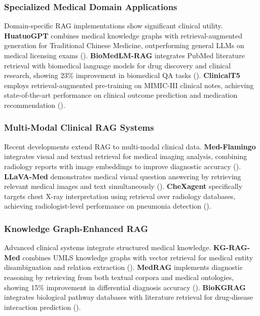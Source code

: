 \subsubsection{Specialized Medical Domain Applications}
Domain-specific RAG implementations show significant clinical utility. \textbf{HuatuoGPT} combines medical knowledge graphs with retrieval-augmented generation for Traditional Chinese Medicine, outperforming general LLMs on medical licensing exams (\citep{zhang2023huatuogpt}). \textbf{BioMedLM-RAG} integrates PubMed literature retrieval with biomedical language models for drug discovery and clinical research, showing 23\% improvement in biomedical QA tasks (\citep{bolton2024biomedlm}). \textbf{ClinicalT5} employs retrieval-augmented pre-training on MIMIC-III clinical notes, achieving state-of-the-art performance on clinical outcome prediction and medication recommendation (\citep{lehman2023clinicalt5}).

\subsubsection{Multi-Modal Clinical RAG Systems}
Recent developments extend RAG to multi-modal clinical data. \textbf{Med-Flamingo} integrates visual and textual retrieval for medical imaging analysis, combining radiology reports with image embeddings to improve diagnostic accuracy (\citep{moor2023medflamingo}). \textbf{LLaVA-Med} demonstrates medical visual question answering by retrieving relevant medical images and text simultaneously (\citep{li2023llavamed}). \textbf{CheXagent} specifically targets chest X-ray interpretation using retrieval over radiology databases, achieving radiologist-level performance on pneumonia detection (\citep{chen2024chexagent}).

\subsubsection{Knowledge Graph-Enhanced RAG}
Advanced clinical systems integrate structured medical knowledge. \textbf{KG-RAG-Med} combines UMLS knowledge graphs with vector retrieval for medical entity disambiguation and relation extraction (\citep{yasunaga2023kgragmed}). \textbf{MedRAG} implements diagnostic reasoning by retrieving from both textual corpora and medical ontologies, showing 15\% improvement in differential diagnosis accuracy (\citep{xiong2024medrag}). \textbf{BioKGRAG} integrates biological pathway databases with literature retrieval for drug-disease interaction prediction (\citep{wang2024biokgrag}).

